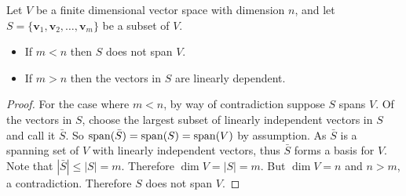 \begin{theorem}\label{thrm-basis-is-smallest-spanning-and-largest-linearly-independent-set}
    Let $V$ be a finite dimensional vector space with dimension $n$, and let $S = \{\mathbf{v}_1, \mathbf{v}_2, \dots, \mathbf{v}_m\}$ be a subset of $V$.
    \begin{itemize}
        \item If $m < n$ then $S$ does not span $V$.
        \item If $m > n$ then the vectors in $S$ are linearly dependent.
    \end{itemize}
\end{theorem}
\begin{proof}
    For the case where $m < n$, by way of contradiction suppose $S$ spans $V$. Of the vectors in $S$, choose the largest subset of linearly independent vectors in $S$ and call it $\bar{S}$. So $\mathrm{span}(\bar{S}) = \mathrm{span}(S) = \mathrm{span}(V)$ by assumption. As $\bar{S}$ is a spanning set of $V$ with linearly independent vectors, thus $\bar{S}$ forms a basis for $V$. Note that $|\bar{S}| \leq |S| = m$. Therefore $\dim V = |S| = m$. But $\dim V = n$ and $n > m$, a contradiction. Therefore $S$ does not span $V$.


\end{proof}
